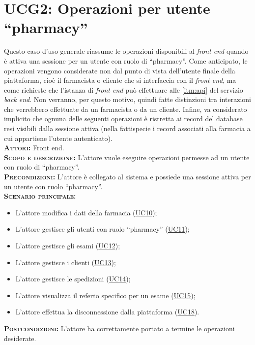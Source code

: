 \section{UCG2: Operazioni per utente ``pharmacy''}
\label{sec:UCG2}
Questo caso d'uso generale riassume le operazioni disponibili al \textit{front end} quando è attiva una sessione per un utente con ruolo di ``pharmacy''. Come anticipato, le operazioni vengono considerate non dal punto di vista dell'utente finale della piattaforma, cioè il farmacista o cliente che si interfaccia con il \textit{front end}, ma come richieste che l'istanza di \textit{front end} può effettuare alle \ref{itm:api} del servizio \textit{back end}. Non verranno, per questo motivo, quindi fatte distinzioni tra interazioni che verrebbero effettuate da un farmacista o da un cliente. Infine, va considerato implicito che ognuna delle seguenti operazioni è ristretta ai record del database resi visibili dalla sessione attiva (nella fattispecie i record associati alla farmacia a cui appartiene l'utente autenticato).\\
\textsc{\textbf{Attori:}} Front end.\\
\textsc{\textbf{Scopo e descrizione:}} L'attore vuole eseguire operazioni permesse ad un utente con ruolo di ``pharmacy''.\\
\textsc{\textsc{\textbf{Precondizioni:}}} L'attore è collegato al sistema e possiede una sessione attiva per un utente con ruolo ``pharmacy''.\\
\textsc{\textbf{Scenario principale:}} 
\begin{itemize}
    \item L'attore modifica i dati della farmacia (\hyperref[sec:UC10]{UC10});
    \item L'attore gestisce gli utenti con ruolo ``pharmacy'' (\hyperref[sec:UC11]{UC11});
    \item L'attore gestisce gli esami (\hyperref[sec:UC12]{UC12});
    \item L'attore gestisce i clienti (\hyperref[sec:UC13]{UC13});
    \item L'attore gestisce le spedizioni (\hyperref[sec:UC14]{UC14});
    \item L'attore visualizza il referto specifico per un esame (\hyperref[sec:UC15]{UC15});
    \item L'attore effettua la disconnessione dalla piattaforma (\hyperref[sec:UC18]{UC18}).
\end{itemize}
\textsc{\textbf{Postcondizioni:}} L'attore ha correttamente portato a termine le operazioni desiderate.

